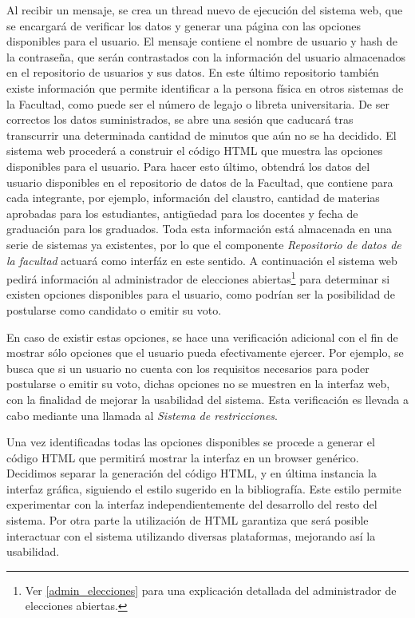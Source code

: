 Al recibir un mensaje, se crea un thread nuevo de ejecución del sistema web, que se encargará de verificar los datos y generar una página con las opciones disponibles para el usuario. 
El mensaje contiene el nombre de usuario y hash de la contraseña, que serán contrastados con la información del usuario almacenados en el repositorio de usuarios y sus datos. En este último repositorio también existe información que permite identificar a la persona física en otros sistemas de la Facultad, como puede ser el número de legajo o libreta universitaria. 
De ser correctos los datos suministrados, se abre una sesión que caducará tras transcurrir una determinada cantidad de minutos que aún no se ha decidido.
El sistema web procederá a construir el código HTML que muestra las opciones disponibles para el usuario. Para hacer esto último, obtendrá los datos del usuario disponibles en el repositorio de datos de la Facultad, que contiene para cada integrante, por ejemplo, información del claustro, cantidad de materias aprobadas para los estudiantes, antigüedad para los docentes y fecha de graduación para los graduados. Toda esta información está almacenada en una serie de sistemas ya existentes, por lo que el componente \emph{Repositorio de datos de la facultad} actuará como interfáz en este sentido.
A continuación el sistema web pedirá información al administrador de elecciones abiertas\footnote{Ver \ref{admin_elecciones} para una explicación detallada del administrador de elecciones abiertas.} para determinar si existen opciones disponibles para el usuario, como podrían ser la posibilidad de postularse como candidato o emitir su voto.


En caso de existir estas opciones, se hace una verificación adicional con el fin de mostrar sólo opciones que el usuario pueda efectivamente ejercer.  
Por ejemplo, se busca que si un usuario no cuenta con los requisitos necesarios para poder postularse o emitir su voto, dichas opciones no se muestren en la interfaz web, con la finalidad de mejorar la usabilidad del sistema. 
Esta verificación es llevada a cabo mediante una llamada al \emph{Sistema de restricciones}.

Una vez identificadas todas las opciones disponibles se procede a generar el código HTML que permitirá mostrar la interfaz en un browser genérico. 
Decidimos separar la generación del código HTML, y en última instancia la interfaz gráfica, siguiendo el estilo sugerido en la bibliografía. 
Este estilo permite experimentar con la interfaz independientemente del desarrollo del resto del sistema. 
Por otra parte la utilización de HTML garantiza que será posible interactuar con el sistema utilizando diversas plataformas, mejorando así la usabilidad.



